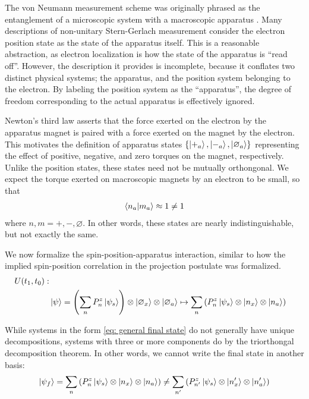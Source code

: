 The von Neumann measurement scheme was originally phrased as the entanglement of a microscopic system with a macroscopic apparatus \cite{Neumann}. Many descriptions of non-unitary Stern-Gerlach measurement consider the electron position state as the state of the apparatus itself. This is a reasonable abstraction, as electron localization is how the state of the apparatus is ``read off''. However, the description it provides is incomplete, because it conflates two distinct physical systems; the apparatus, and the position system belonging to the electron. By labeling the position system as the ``apparatus'', the degree of freedom corresponding to the actual apparatus is effectively ignored.

Newton's third law asserts that the force exerted on the electron by the apparatus magnet is paired with a force exerted on the magnet by the electron. This motivates the definition of apparatus states $\{\ket{+_a}, \ket{-_a}, \ket{\varnothing_a}\}$ representing the effect of positive, negative, and zero torques on the magnet, respectively. Unlike the position states, these states need not be mutually orthongonal. We expect the torque exerted on macroscopic magnets by an electron to be small, so that
\begin{align}
  \braket{n_a | m_a} \approx 1 \neq 1
\end{align}
where $n, m = +, -, \varnothing$. In other words, these states are nearly indistinguishable, but not exactly the same.

We now formalize the spin-position-apparatus interaction, similar to how the implied spin-position correlation in the projection postulate was formalized.
\begin{align} \label{eq: unitary operator inselection}
    \nonumber U(t_1, t_0): \\
    & \ket{\psi} = \left(\sum_{n} P^z_n\ket{\psi_s}\right) \otimes \ket{\varnothing_x} \otimes \ket{\varnothing_a} \mapsto \sum_{n}\left(P^z_n\ket{\psi_s} \otimes \ket{n_x} \otimes \ket{n_a} \right)
\end{align}

While systems in the form \autoref{eq: general final state} do not generally have unique decompositions, systems with three or more components do by the triorthongal decomposition theorem. In other words, we cannot write the final state in another basis:
\begin{align}
  \ket{\psi_f} = \sum_{n}\left(P^z_n\ket{\psi_s} \otimes \ket{n_x} \otimes \ket{n_a} \right) \neq \sum_{n'}\left(P^z_{n'}\ket{\psi_s} \otimes \ket{n'_x} \otimes \ket{n'_a} \right)
\end{align}

